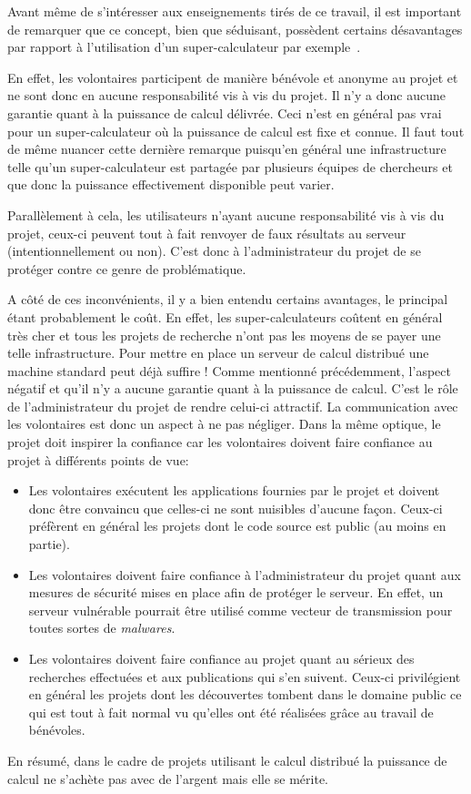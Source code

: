 \documentclass[a4paper, 11pt]{report}
\begin{document}
Avant même de s'intéresser aux enseignements tirés de ce travail, il est important de remarquer que ce concept, bien que séduisant, possèdent certains désavantages par rapport à l'utilisation d'un super-calculateur par exemple~\cite{VOLUNTEER}.

En effet, les volontaires participent de manière bénévole et anonyme au projet et ne sont donc en aucune responsabilité vis à vis du projet. Il n'y a donc aucune garantie quant à la puissance de calcul délivrée. Ceci n'est en général pas vrai pour un super-calculateur où la puissance de calcul est fixe et connue. Il faut tout de même nuancer cette dernière remarque puisqu'en général une infrastructure telle qu'un super-calculateur est partagée par plusieurs équipes de chercheurs et que donc la puissance effectivement disponible peut varier.

Parallèlement à cela, les utilisateurs n'ayant aucune responsabilité vis à vis du projet, ceux-ci peuvent tout à fait renvoyer de faux résultats au serveur (intentionnellement ou non). C'est donc à l'administrateur du projet de se protéger contre ce genre de problématique.

A côté de ces inconvénients, il y a bien entendu certains avantages, le principal étant probablement le coût. En effet, les super-calculateurs coûtent en général très cher et tous les projets de recherche n'ont pas les moyens de se payer une telle infrastructure. Pour mettre en place un serveur de calcul distribué une machine standard peut déjà suffire ! Comme mentionné précédemment, l'aspect négatif et qu'il n'y a aucune garantie quant à la puissance de calcul. C'est le rôle de l'administrateur du projet de rendre celui-ci attractif. La communication avec les volontaires est donc un aspect à ne pas négliger. Dans la même optique, le projet doit inspirer la confiance car les volontaires doivent faire confiance au projet à différents points de vue:
\begin{itemize}
\item Les volontaires exécutent les applications fournies par le projet et doivent donc être convaincu que celles-ci ne sont nuisibles d'aucune façon. Ceux-ci préfèrent en général les projets dont le code source est public (au moins en partie).
\item Les volontaires doivent faire confiance à l'administrateur du projet quant aux mesures de sécurité mises en place afin de protéger le serveur. En effet, un serveur vulnérable pourrait être utilisé comme vecteur de transmission pour toutes sortes de \textit{malwares}.
\item Les volontaires doivent faire confiance au projet quant au sérieux des recherches effectuées et aux publications qui s'en suivent. Ceux-ci privilégient en général les projets dont les découvertes tombent dans le domaine public ce qui est tout à fait normal vu qu'elles ont été réalisées grâce au travail de bénévoles.
\end{itemize}
En résumé, dans le cadre de projets utilisant le calcul distribué la puissance de calcul ne s'achète pas avec de l'argent mais elle se mérite.
\end{document}
